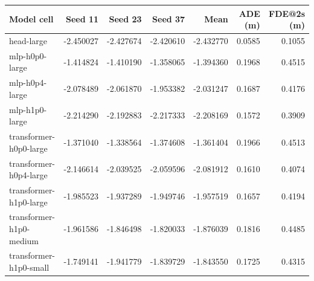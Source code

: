 \begin{tabular}{lrrrrrr}
\toprule
Model cell & Seed 11 & Seed 23 & Seed 37 & Mean & ADE (m) & FDE@2s (m) \\
\midrule
head-large & -2.450027 & -2.427674 & -2.420610 & -2.432770 & 0.0585 & 0.1055 \\
mlp-h0p0-large & -1.414824 & -1.410190 & -1.358065 & -1.394360 & 0.1968 & 0.4515 \\
mlp-h0p4-large & -2.078489 & -2.061870 & -1.953382 & -2.031247 & 0.1687 & 0.4176 \\
mlp-h1p0-large & -2.214290 & -2.192883 & -2.217333 & -2.208169 & 0.1572 & 0.3909 \\
transformer-h0p0-large & -1.371040 & -1.338564 & -1.374608 & -1.361404 & 0.1966 & 0.4513 \\
transformer-h0p4-large & -2.146614 & -2.039525 & -2.059596 & -2.081912 & 0.1610 & 0.4074 \\
transformer-h1p0-large & -1.985523 & -1.937289 & -1.949746 & -1.957519 & 0.1657 & 0.4194 \\
transformer-h1p0-medium & -1.961586 & -1.846498 & -1.820033 & -1.876039 & 0.1816 & 0.4485 \\
transformer-h1p0-small & -1.749141 & -1.941779 & -1.839729 & -1.843550 & 0.1725 & 0.4315 \\
\bottomrule
\end{tabular}
